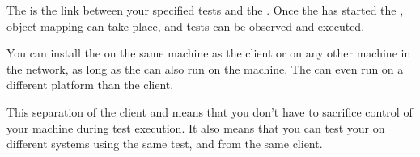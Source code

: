 The \gdagent{} is the link between your specified tests and the \gdaut{}. 
Once the \gdagent has started the \gdaut{}, object mapping can take place, and tests can be observed and executed.  

You can install the \gdagent on the same machine as the client or on any other machine in the network, as long as the \gdaut{} can also run on the machine. The \gdagent can even run on a different platform than  the client{}. 

This separation
of the client and \gdagent means that you don't have to sacrifice  control of your  machine during test execution.
It also means that you can test your \gdaut{} on different systems using the same test, and from the same client. 

